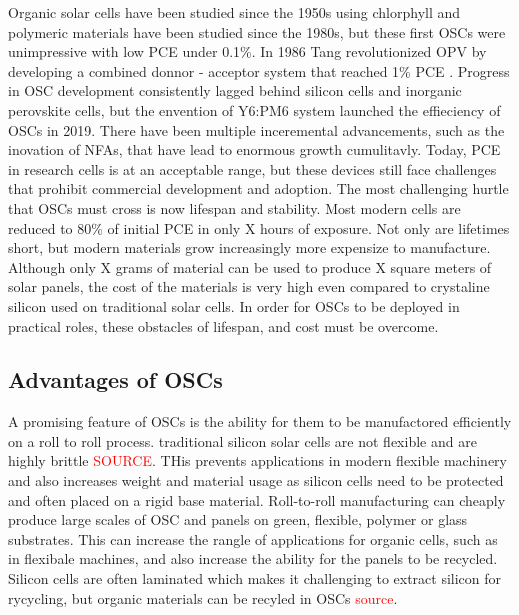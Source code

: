 Organic solar cells have been studied since the 1950s using chlorphyll and polymeric materials have been studied since the 1980s, but these first OSCs were unimpressive with low PCE under 0.1\%.
In 1986 Tang revolutionized OPV by developing a combined donnor - acceptor system that reached 1\% PCE \autocite{spanggaardBriefHistoryDevelopment2004}.
Progress in OSC development consistently lagged behind silicon cells and inorganic perovskite cells\autocite{chenOrganicSolarCells2019}, but the envention of Y6:PM6 system launched the effieciency of OSCs in 2019\autocite{yuanSingleJunctionOrganicSolar2019}.
There have been multiple inceremental advancements, such as the inovation of NFAs, that have lead to enormous growth cumulitavly.
Today, PCE in research cells is at an acceptable range, but these devices still face challenges that prohibit commercial development and adoption.
The most challenging hurtle that OSCs must cross is now lifespan and stability.
Most modern cells are reduced to 80\% of initial PCE in only X hours of exposure.
Not only are lifetimes short, but modern materials grow increasingly more expensize to manufacture.
Although only X grams of material can be used to produce X square meters of solar panels, the cost of the materials is very high even compared to crystaline silicon used on traditional solar cells.
In order for OSCs to be deployed in practical roles, these obstacles of lifespan, and cost must be overcome.

\subsection{Advantages of OSCs}
A promising feature of OSCs is the ability for them to be manufactored efficiently on a roll to roll process.
traditional silicon solar cells are not flexible and are highly brittle \textcolor{red}{SOURCE}.
THis prevents applications in modern flexible machinery and also increases weight and material usage as silicon cells need to be protected and often placed on a rigid base material.
Roll-to-roll manufacturing can cheaply produce large scales of OSC and panels on green, flexible, polymer or glass substrates.
This can increase the rangle of applications for organic cells, such as in flexibale machines, and also increase the ability for the panels to be recycled.
Silicon cells are often laminated which makes it challenging to extract silicon for rycycling, but organic materials can be recyled in OSCs \textcolor{red}{source}.

